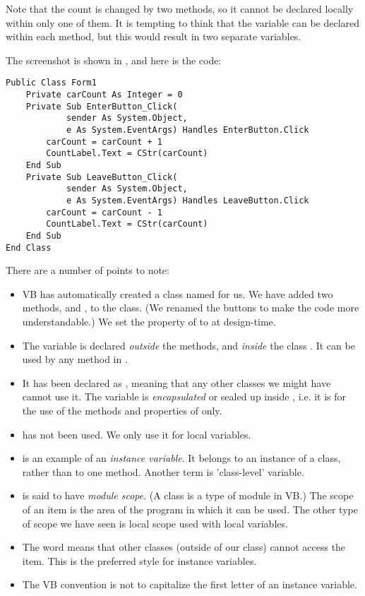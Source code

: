 		Note that the count is changed by two methods, so it cannot be declared locally within only one of them. It is tempting to think that the variable can be declared within each method, but this would result in two separate variables.
		
		The screenshot is shown in , and here is the code:
		\begin{lstlisting}
Public Class Form1
	Private carCount As Integer = 0
	Private Sub EnterButton_Click(
			sender As System.Object,	
			e As System.EventArgs) Handles EnterButton.Click
		carCount = carCount + 1
		CountLabel.Text = CStr(carCount)
	End Sub
	Private Sub LeaveButton_Click(
			sender As System.Object,
			e As System.EventArgs) Handles LeaveButton.Click
		carCount = carCount - 1
		CountLabel.Text = CStr(carCount)
	End Sub
End Class
		\end{lstlisting}
		There are a number of points to note:
		\begin{itemize}
			\item VB has automatically created a class named  for us. We have added two methods,  and , to the class. (We renamed the buttons to make the code more understandable.) We set the  property of  to  at design-time.
			\item The variable  is declared \emph{outside} the methods, and \emph{inside} the class . It can be used by any method in .
			\item It has been declared as , meaning that any other classes we might have cannot use it. The variable is \emph{encapsulated} or sealed up inside , i.e. it is for the use of the methods and properties of  only.
			\item {} has not been used. We only use it for local variables.
			\item {} is an example of an \emph{instance variable}. It belongs to an instance of a class, rather than to one method. Another term is 'class-level' variable.
			\item {} is said to have \emph{module scope}. (A class is a type of module in VB.) The scope of an item is the area of the program in which it can be used. The other type of scope we have seen is local scope used with local variables.
			\item The word  means that other classes (outside of our  class) cannot access the item. This is the preferred style for instance variables.
			\item The VB convention is not to capitalize the first letter of an instance variable.
		\end{itemize}
